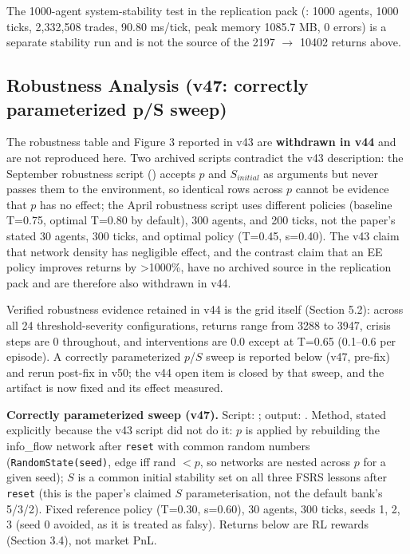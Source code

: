 \documentclass[11pt]{article}
\begin{document}
The 1000-agent system-stability test in the replication pack (: 1000 agents, 1000 ticks, 2,332,508 trades, 90.80 ms/tick, peak memory 1085.7 MB, 0 errors) is a separate stability run and is not the source of the 2197 $\rightarrow$ 10402 returns above.

\subsection{Robustness Analysis (v47: correctly parameterized p/S sweep)}
The robustness table and Figure 3 reported in v43 are \textbf{withdrawn in v44} and are not reproduced here. Two archived scripts contradict the v43 description: the September robustness script () accepts $p$ and $S_{initial}$ as arguments but never passes them to the environment, so identical rows across $p$ cannot be evidence that $p$ has no effect; the April robustness script uses different policies (baseline T=0.75, optimal T=0.80 by default), 300 agents, and 200 ticks, not the paper's stated 30 agents, 300 ticks, and optimal policy (T=0.45, s=0.40). The v43 claim that network density has negligible effect, and the contrast claim that an EE policy improves returns by >1000\%, have no archived source in the replication pack and are therefore also withdrawn in v44.

Verified robustness evidence retained in v44 is the grid itself (Section 5.2): across all 24 threshold-severity configurations, returns range from 3288 to 3947, crisis steps are 0 throughout, and interventions are 0.0 except at T=0.65 (0.1--0.6 per episode). A correctly parameterized $p$/$S$ sweep is reported below (v47, pre-fix) and rerun post-fix in v50; the v44 open item is closed by that sweep, and the artifact is now fixed and its effect measured.

\textbf{Correctly parameterized sweep (v47).} Script: ; output: . Method, stated explicitly because the v43 script did not do it: $p$ is applied by rebuilding the info\_flow network after \texttt{reset} with common random numbers (\texttt{RandomState(seed)}, edge iff rand $< p$, so networks are nested across $p$ for a given seed); $S$ is a common initial stability set on all three FSRS lessons after \texttt{reset} (this is the paper's claimed $S$ parameterisation, not the default bank's 5/3/2). Fixed reference policy (T=0.30, s=0.60), 30 agents, 300 ticks, seeds 1, 2, 3 (seed 0 avoided, as it is treated as falsy). Returns below are RL rewards (Section 3.4), not market PnL.
\end{document}
